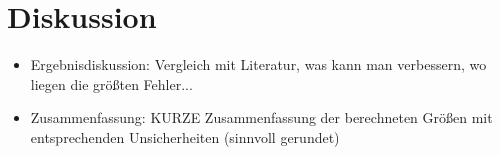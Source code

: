 \section{Diskussion}
\label{sec:Diskussion}

\begin{itemize}
    \item Ergebnisdiskussion: Vergleich mit Literatur, was kann man verbessern, wo liegen die größten Fehler...
    \item Zusammenfassung: KURZE Zusammenfassung der berechneten Größen mit entsprechenden Unsicherheiten (sinnvoll gerundet)
\end{itemize}